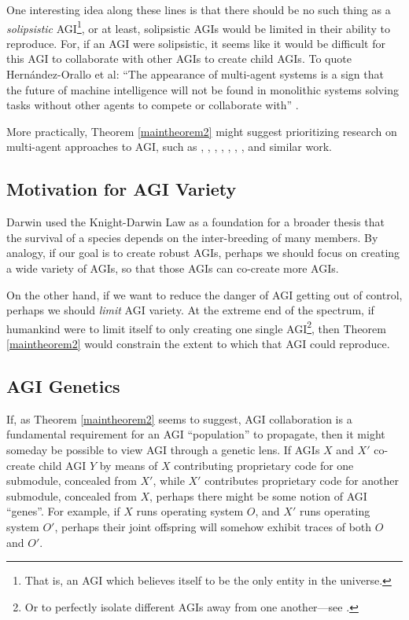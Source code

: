 \documentclass[runningheads]{llncs}
\begin{document}
One interesting idea along these lines is that there should be no
such thing as a \emph{solipsistic} AGI\footnote{That is, an AGI which believes itself
to be the only entity in the universe.}, or at least, solipsistic AGIs would be
limited in their ability to reproduce.
For, if an AGI were solipsistic, it
seems like it would be difficult for this AGI to collaborate with other AGIs
to create child AGIs.
To quote Hern{\'a}ndez-Orallo et al: ``The appearance of multi-agent systems is a sign that
the future of machine intelligence will not be found in monolithic systems
solving tasks without other agents to compete or collaborate with''
\cite{hernandez2011more}.

More practically,
Theorem \ref{maintheorem2} might suggest
prioritizing research on multi-agent approaches to AGI, such as
\cite{castelfranchi1998modelling}, \cite{hernandez2011more},
\cite{hibbard2011societies}, \cite{lazaridou2018emergence},
\cite{thorisson2004constructionist}, \cite{potyka2016group},
\cite{kolonin2018reputation},
and similar work.

\subsection{Motivation for AGI Variety}

Darwin used the Knight-Darwin Law as a foundation for
a broader thesis that the survival of a
species depends on the inter-breeding of many members.
By analogy, if our goal is to create robust AGIs, perhaps
we should focus on creating a wide variety of AGIs, so that
those AGIs can co-create more AGIs.

On the other hand, if we want to reduce the danger of AGI getting out of control,
perhaps we should \emph{limit} AGI variety. At the extreme end
of the spectrum, if humankind were to limit itself to only creating one single
AGI\footnote{Or to perfectly isolate
different AGIs away from
one another---see \cite{yampolskiy2012leakproofing}.}, then
Theorem \ref{maintheorem2} would constrain the extent to which
that AGI could reproduce.


\subsection{AGI Genetics}

If, as Theorem \ref{maintheorem2} seems to suggest, AGI collaboration
is a fundamental requirement for an AGI ``population'' to propagate, then it might
someday be possible to view AGI through a genetic lens. If AGIs $X$ and $X'$
co-create child AGI $Y$ by
means of $X$ contributing proprietary code for one submodule, concealed from $X'$,
while $X'$ contributes proprietary code for another submodule, concealed from $X$,
perhaps there might be some notion of AGI ``genes''. For example, if $X$ runs operating
system $O$, and $X'$ runs operating system $O'$, perhaps their joint offspring
will somehow exhibit traces of both $O$ and $O'$.
\end{document}
